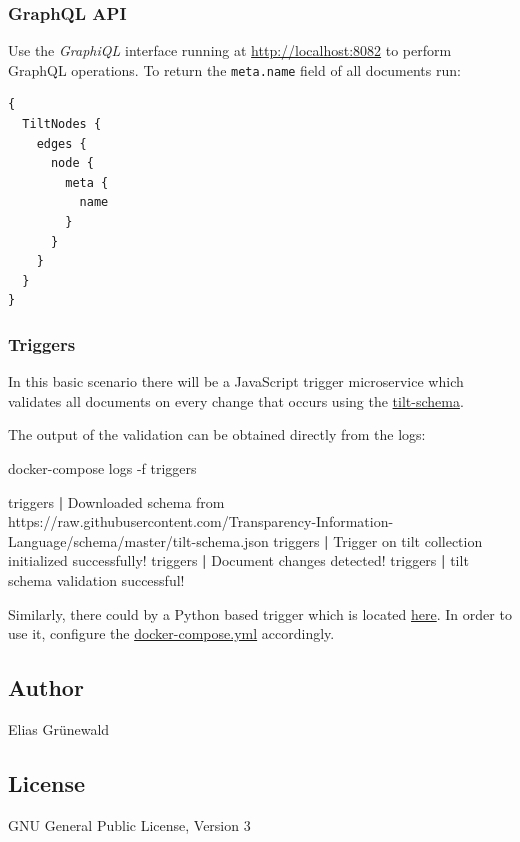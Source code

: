 \documentclass[
]{article}
\newenvironment{Shaded}{}{}
\newcommand{\ExtensionTok}[1]{#1}
\newcommand{\KeywordTok}[1]{\textcolor[rgb]{0.00,0.44,0.13}{\textbf{#1}}}
\newcommand{\NormalTok}[1]{#1}
\begin{document}
\hypertarget{graphql-api}{%
\subsubsection{GraphQL API}\label{graphql-api}}

Use the \emph{GraphiQL} interface running at
\href{}{http://localhost:8082} to perform GraphQL operations. To return
the \texttt{meta.name} field of all documents run:

\begin{verbatim}
{
  TiltNodes {
    edges {
      node {
        meta {
          name
        }
      }
    }
  }
}
\end{verbatim}

\hypertarget{triggers}{%
\subsubsection{Triggers}\label{triggers}}

In this basic scenario there will be a JavaScript trigger microservice
which validates all documents on every change that occurs using the
\href{https://github.com/Transparency-Information-Language/schema}{tilt-schema}.

The output of the validation can be obtained directly from the logs:

\begin{Shaded}
\begin{Highlighting}[]
\ExtensionTok{docker{-}compose}\NormalTok{ logs {-}f triggers}

\ExtensionTok{triggers}         \KeywordTok{|} \ExtensionTok{Downloaded}\NormalTok{ schema from https://raw.githubusercontent.com/Transparency{-}Information{-}Language/schema/master/tilt{-}schema.json}
\ExtensionTok{triggers}         \KeywordTok{|} \ExtensionTok{Trigger}\NormalTok{ on tilt collection initialized successfully!}
\ExtensionTok{triggers}         \KeywordTok{|} \ExtensionTok{Document}\NormalTok{ changes detected!}
\ExtensionTok{triggers}         \KeywordTok{|} \ExtensionTok{tilt}\NormalTok{ schema validation successful!}
\end{Highlighting}
\end{Shaded}

Similarly, there could by a Python based trigger which is located
\href{./triggers/python}{here}. In order to use it, configure the
\href{./docker-compose.yml}{docker-compose.yml} accordingly.

\hypertarget{author}{%
\subsection{Author}\label{author}}

Elias Grünewald

\hypertarget{license}{%
\subsection{License}\label{license}}

GNU General Public License, Version 3
\end{document}
